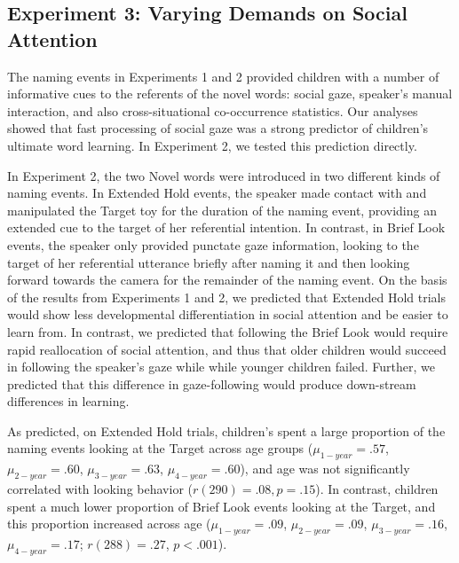 \documentclass{pnastwo}
\begin{document}
\begin{article}
\section{Experiment 3: Varying Demands on Social Attention}

The naming events in Experiments 1 and 2 provided children with a number of informative cues to the referents of the novel words: social gaze, speaker's manual interaction, and also cross-situational co-occurrence statistics. Our analyses showed that fast processing of social gaze was a strong predictor of children's ultimate word learning. In Experiment 2, we tested this prediction directly.

In Experiment 2, the two Novel words were introduced in two different kinds of naming events. In Extended Hold events, the speaker made contact with and manipulated the Target toy for the duration of the naming event, providing an extended cue to the target of her referential intention. In contrast, in Brief Look events, the speaker only provided punctate gaze information, looking to the target of her referential utterance briefly after naming it and then looking forward towards the camera for the remainder of the naming event. On the basis of the results from Experiments 1 and 2, we predicted that Extended Hold trials would show less developmental differentiation in social attention and be easier to learn from. In contrast, we predicted that following the Brief Look would require rapid reallocation of social attention, and thus that older children would succeed in following the speaker's gaze while while younger children failed. Further, we predicted that this difference in gaze-following would produce down-stream differences in learning.

As predicted, on Extended Hold trials, children's spent a large proportion of the naming events looking at the Target across age groups ($\mu_{1-year} = .57$, $\mu_{2-year} = .60$, $\mu_{3-year} = .63$, $\mu_{4-year} = .60$), and age was not significantly correlated with looking behavior ($r(290) = .08, p = .15$). In contrast, children spent a much lower proportion of Brief Look events looking at the Target, and this proportion increased across age ($\mu_{1-year} = .09$, $\mu_{2-year} = .09$, $\mu_{3-year} = .16$, $\mu_{4-year} = .17$; $r(288) = .27$, $p  < .001$).


\end{article}
\end{document}
